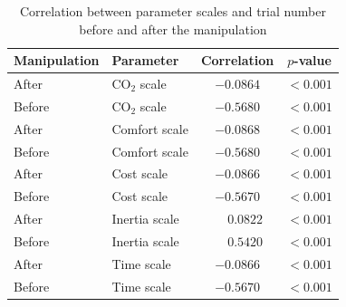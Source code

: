 \documentclass[man,natbib,floatsintext]{apa7}
\begin{document}
\begin{table}[htbp]
\centering
\caption{Correlation between parameter scales and trial number before and after the manipulation}
\label{tab:beta_trial_correlations_period}
\begin{tabular}{llcc}
\toprule
Manipulation & Parameter & Correlation & $p$-value \\
\midrule
After  & CO$_2$ scale  & $-0.0864$ & $<0.001$ \\
Before & CO$_2$ scale  & $-0.5680$ & $<0.001$ \\
After  & Comfort scale & $-0.0868$ & $<0.001$ \\
Before & Comfort scale & $-0.5680$ & $<0.001$ \\
After  & Cost scale    & $-0.0866$ & $<0.001$ \\
Before & Cost scale    & $-0.5670$ & $<0.001$ \\
After  & Inertia scale & $\phantom{-}0.0822$ & $<0.001$ \\
Before & Inertia scale & $\phantom{-}0.5420$ & $<0.001$ \\
After  & Time scale    & $-0.0866$ & $<0.001$ \\
Before & Time scale    & $-0.5670$ & $<0.001$ \\
\bottomrule
\end{tabular}
\end{table}
\end{document}
